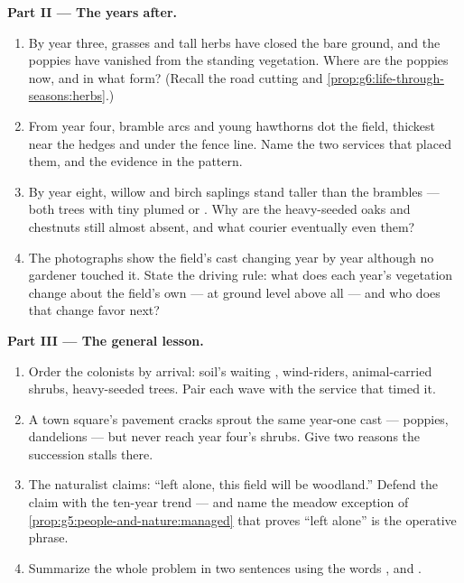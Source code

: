 \begin{problem}
\medskip\noindent\textbf{Part II --- The years after.}
\begin{enumerate}[resume]
  \item By year three, grasses and tall herbs have closed
        the bare ground, and the poppies have vanished from
        the standing vegetation. Where are the poppies now,
        and in what form? (Recall the road cutting and
        \cref{prop:g6:life-through-seasons:herbs}.)
  \item From year four, bramble arcs and young hawthorns
        dot the field, thickest near the hedges and under
        the fence line. Name the two services that placed
        them, and the evidence in the pattern.
  \item By year eight, willow and birch saplings stand
        taller than the brambles --- both trees with tiny
        plumed or  . Why are the heavy-seeded
        oaks and chestnuts still almost absent, and what
         courier eventually  even them?
  \item The photographs show the field's cast changing
        year by year although no gardener touched it. State
        the driving rule: what does each year's vegetation
        change about the field's own  --- 
        at ground level above all --- and who does that
        change favor next?
\end{enumerate}

\medskip\noindent\textbf{Part III --- The general lesson.}
\begin{enumerate}[resume]
  \item Order the colonists by arrival: soil's waiting
        , wind-riders, animal-carried shrubs,
        heavy-seeded trees. Pair each wave with the
         service that timed it.
  \item A town square's pavement cracks sprout the same
        year-one cast --- poppies, dandelions --- but never
        reach year four's shrubs. Give two reasons the
        succession stalls there.
  \item The naturalist claims: ``left alone, this field
        will be woodland.'' Defend the claim with the
        ten-year trend --- and name the meadow exception of
        \cref{prop:g5:people-and-nature:managed} that
        proves ``left alone'' is the operative phrase.
  \item Summarize the whole problem in two sentences using
        the words \emph{}, \emph{} and
        \emph{}.
\end{enumerate}
\end{problem}

